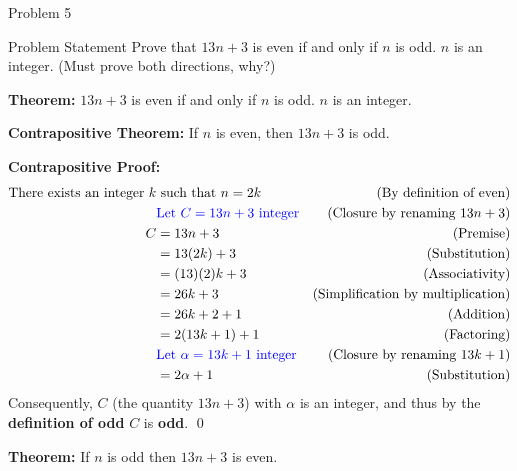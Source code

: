 \begin{problem}{Problem 5}
    \begin{statement}{Problem Statement}
        Prove that $13n + 3$ is even if and only if $n$ is odd. $n$ is an integer. (Must prove both directions, why?)
    \end{statement}

    \begin{highlight}[Solution]
        \textbf{Theorem:} $13n + 3$ is even if and only if $n$ is odd. $n$ is an integer. \vspace*{1em}

        \textbf{Contrapositive Theorem:} If $n$ is even, then $13n + 3$ is odd. \vspace*{1em}

        \textbf{Contrapositive Proof:} \newline
        \begin{align*}
            \text{There exists an integer } k & \text{ such that } n = 2k & \text{(By definition of even)} \\
            & \textcolor{blue}{\text{Let } C = 13n + 3 \text{ integer}} & \text{(Closure by renaming $13n + 3$)} \\
            C & = 13n + 3 & \text{(Premise)} \\
            & = 13(2k) + 3 & \text{(Substitution)} \\
            & = (13)(2)k + 3 & \text{(Associativity)} \\
            & = 26k + 3 & \text{(Simplification by multiplication)} \\
            & = 26k + 2 + 1 & \text{(Addition)} \\
            & = 2(13k + 1) + 1 & \text{(Factoring)} \\
            & \textcolor{blue}{\text{Let } \alpha = 13k + 1 \text{ integer}} & \text{(Closure by renaming $13k + 1$)} \\
            & = 2\alpha + 1 & \text{(Substitution)}
        \end{align*}
        Consequently, $C$ (the quantity $13n + 3$) with $\alpha$ is an integer, and thus by the \textbf{definition of odd} $C$ is \textbf{odd}. \qed

        \vspace*{1em}
    
        \textbf{Theorem:} If $n$ is odd then $13n + 3$ is even. \vspace*{1em}
    

\end{highlight}
\end{problem}
